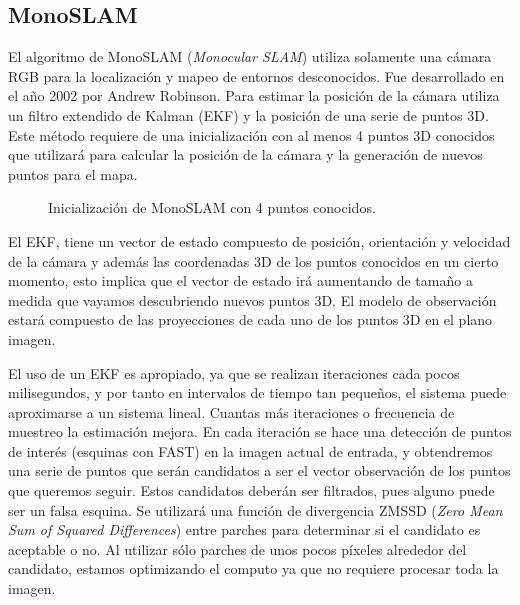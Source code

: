 \clearpage

\subsection{MonoSLAM}
El algoritmo de  MonoSLAM (\textit{Monocular SLAM}) \cite{Davison2007monoslam} utiliza solamente una cámara RGB para la localización y mapeo de entornos desconocidos. Fue desarrollado en el año 2002  por Andrew Robinson. Para estimar la posición de la cámara utiliza un filtro extendido de Kalman (EKF) y la posición de una serie de puntos 3D. Este método requiere de una inicialización con al menos 4 puntos 3D conocidos que utilizará para calcular la posición de la cámara y la generación de nuevos puntos para el mapa.
\begin{figure}[H]
\begin{center}
\end{center}
\caption{Inicialización de MonoSLAM con 4 puntos conocidos.}
\end{figure}

El EKF, tiene un vector de estado compuesto de posición, orientación y velocidad de la cámara y además las coordenadas 3D de los puntos conocidos en un cierto momento, esto implica que el vector de estado irá aumentando de tamaño a medida que vayamos descubriendo nuevos puntos 3D. El modelo de observación estará compuesto de las proyecciones de cada uno de los puntos 3D en el plano imagen.

El uso de un EKF es apropiado, ya que se realizan iteraciones cada pocos milisegundos, y por tanto en intervalos de tiempo tan pequeños, el sistema puede aproximarse a un sistema lineal. Cuantas más iteraciones o frecuencia de muestreo la estimación mejora. En cada iteración se hace una detección de puntos de interés (esquinas con FAST) en la imagen actual de entrada, y obtendremos una serie de puntos que serán candidatos a ser el vector observación de los puntos que queremos seguir. Estos candidatos deberán ser filtrados, pues alguno puede ser un falsa esquina. Se utilizará una función de divergencia ZMSSD (\textit{Zero Mean Sum of Squared Differences}) entre parches para determinar si el candidato es aceptable o no. Al utilizar sólo parches de unos pocos píxeles alrededor del candidato, estamos optimizando el computo ya que no requiere procesar toda la imagen.

